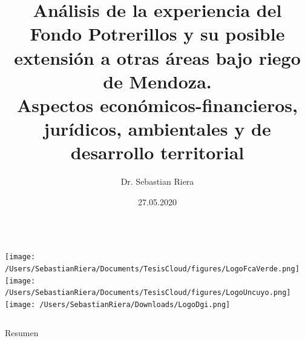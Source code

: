 \documentclass{beamer}\usepackage[]{graphicx}\usepackage[]{color}
\title[Sebastián Riera, Ph.D.]{Análisis de la experiencia del Fondo Potrerillos y su posible extensión a otras áreas bajo riego de Mendoza.\\ Aspectos económicos-financieros, jurídicos, ambientales y de desarrollo territorial}
\author{Dr. Sebastian Riera}
\institute{Avances en materia económica - 2020}   %
\date{27.05.2020}
\makeatletter
\newenvironment{kframe}{%
 \def\at@end@of@kframe{}%
 \ifinner\ifhmode%
  \def\at@end@of@kframe{\end{minipage}}%
  \begin{minipage}{\columnwidth}%
 \fi\fi%
 \def\FrameCommand##1{\hskip\@totalleftmargin \hskip-\fboxsep
 \colorbox{shadecolor}{##1}\hskip-\fboxsep
     \hskip-\linewidth \hskip-\@totalleftmargin \hskip\columnwidth}%
 \MakeFramed {\advance\hsize-\width
   \@totalleftmargin\z@ \linewidth\hsize
   \@setminipage}}%
 {\par\unskip\endMakeFramed%
 \at@end@of@kframe}
\newenvironment{knitrout}{}{} %
\makeatother
\begin{document}
{
\begin{frame} \vspace*{.5cm}\titlepage  
  \begin{columns}
    \texttt{[image: /Users/SebastianRiera/Documents/TesisCloud/figures/LogoFcaVerde.png]}
    \texttt{[image: /Users/SebastianRiera/Documents/TesisCloud/figures/LogoUncuyo.png]}
    \texttt{[image: /Users/SebastianRiera/Downloads/LogoDgi.png]}
  \end{columns}
\end{frame}
}
\addtocounter{framenumber}{-1}



















\begin{knitrout}
\color{fgcolor}\begin{kframe}


{\ttfamily\noindent\itshape\color{messagecolor}{\#\# Linking to GEOS 3.7.2, GDAL 2.4.2, PROJ 5.2.0}}\end{kframe}
\end{knitrout}





\begin{frame}{Resumen}
 \footnotesize \tableofcontents
\end{frame}


\end{document}
